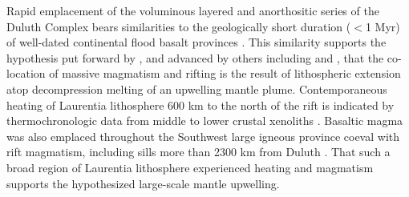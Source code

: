 \documentclass[11pt,letterpaper]{article}
\begin{document}
Rapid emplacement of the voluminous layered and anorthositic series of the Duluth Complex bears similarities to the geologically short duration ($<$1 Myr) of well-dated continental flood basalt provinces \citep{Burgess2015a, Schoene2019a}. This similarity supports the hypothesis put forward by \cite{Green1983a}, and advanced by others including \cite{Cannon1992a} and \cite{Stein2015a}, that the co-location of massive magmatism and rifting is the result of lithospheric extension atop decompression melting of an upwelling mantle plume. Contemporaneous heating of Laurentia lithosphere 600 km to the north of the rift is indicated by thermochronologic data from middle to lower crustal xenoliths \citep{Edwards2018a}. Basaltic magma was also emplaced throughout the Southwest large igneous province coeval with rift magmatism, including sills more than 2300 km from Duluth \citep{Bright2014a}. That such a broad region of Laurentia lithosphere experienced heating and magmatism supports the hypothesized large-scale mantle upwelling.

\end{document}
